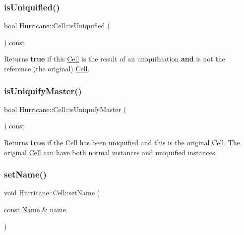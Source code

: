 \subsubsection{\texorpdfstring{is\+Uniquified()}{isUniquified()}}
{\footnotesize\ttfamily bool Hurricane\+::\+Cell\+::is\+Uniquified (\begin{DoxyParamCaption}{ }\end{DoxyParamCaption}) const}

Returns {\bfseries true} if this \mbox{\hyperlink{classHurricane_1_1Cell}{Cell}} is the result of an uniquification {\bfseries and} is not the reference (the original) \mbox{\hyperlink{classHurricane_1_1Cell}{Cell}}. \mbox{\label{classHurricane_1_1Cell_a0220dbbbe730e6874f7620135e9c10f6}} 
\subsubsection{\texorpdfstring{is\+Uniquify\+Master()}{isUniquifyMaster()}}
{\footnotesize\ttfamily bool Hurricane\+::\+Cell\+::is\+Uniquify\+Master (\begin{DoxyParamCaption}{ }\end{DoxyParamCaption}) const}

Returns {\bfseries true} if the \mbox{\hyperlink{classHurricane_1_1Cell}{Cell}} has been uniquified and this is the original \mbox{\hyperlink{classHurricane_1_1Cell}{Cell}}. The original \mbox{\hyperlink{classHurricane_1_1Cell}{Cell}} can have both normal instances and uniquified instances. \mbox{\label{classHurricane_1_1Cell_ad2c9face922062664110c66ee205eab2}} 
\subsubsection{\texorpdfstring{set\+Name()}{setName()}}
{\footnotesize\ttfamily void Hurricane\+::\+Cell\+::set\+Name (\begin{DoxyParamCaption}\item[{const \mbox{\hyperlink{classHurricane_1_1Name}{Name}} \&}]{name }\end{DoxyParamCaption})}

